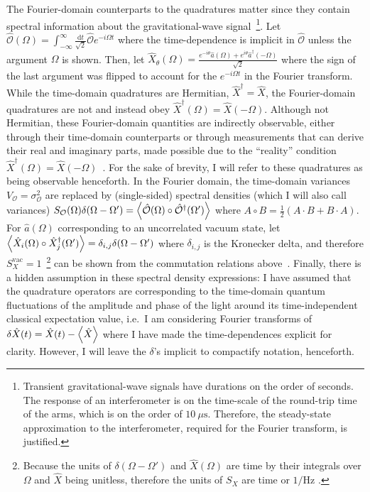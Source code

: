 The Fourier-domain counterparts to the quadratures matter since they contain spectral information about the gravitational-wave signal~\footnote{Transient gravitational-wave signals have durations on the order of seconds. The response of an interferometer is on the time-scale of the round-trip time of the arms, which is on the order of $10~\mu\text{s}$. Therefore, the steady-state approximation to the interferometer, required for the Fourier transform, is justified.}. %
Let $\hat{\mathcal{O}}(\Omega) = \int_{-\infty}^\infty \frac{\mathrm{d}t}{\sqrt{2}} \hat{\mathcal{O}} e^{-i\Omega t}$ where the time-dependence is implicit in $\hat{\mathcal{O}}$ unless the argument $\Omega$ is shown. Then, let $\hat{X}_\theta(\Omega)=\frac{e^{-i \theta}\hat{a}(\Omega)+e^{i \theta}\hat{a}^\dag(-\Omega)}{\sqrt{2}}$ where the sign of the last argument was flipped to account for the $e^{-i\Omega t}$ in the Fourier transform. While the time-domain quadratures are Hermitian, $\hat{X}^\dag=\hat{X}$, the Fourier-domain quadratures are not and instead obey $\hat{X}^\dag(\Omega)=\hat{X}(-\Omega)$. Although not Hermitian, these Fourier-domain quantities are indirectly observable, either through their time-domain counterparts or through measurements that can derive their real and imaginary parts, made possible due to the ``reality'' condition $\hat{X}^\dag(\Omega)=\hat{X}(-\Omega)$~\cite{sourcecitedinReid}. For the sake of brevity, I will refer to these quadratures as being observable henceforth. 
In the Fourier domain, the time-domain variances $V_\mathcal{O}=\sigma_\mathcal{O}^2$ are replaced by (single-sided) spectral densities (which I will also call variances) $S_\mathcal{O}(\Omega)\delta(\Omega-\Omega')=\ev{\hat{\mathcal{O}}(\Omega)\circ\hat{\mathcal{O}}^\dag(\Omega')}$ where $A\circ B=\frac{1}{2}(A\cdot B+B\cdot A)$. For $\hat{a}(\Omega)$ corresponding to an uncorrelated vacuum state, let $\ev{\hat{X}_i(\Omega)\circ\hat{X}_j^\dag(\Omega')}=\delta_{i,j}\delta(\Omega-\Omega')$ where $\delta_{i,j}$ is the Kronecker delta, and therefore $S_X^\text{vac}=1$~\footnote{Because the units of $\delta(\Omega-\Omega')$ and $\hat X(\Omega)$ are time by their integrals over $\Omega$ and $\hat X$ being unitless, therefore the units of $S_X$ are time or $1/\text{Hz}$ .} can be shown from the commutation relations above~\cite{Danilishin}. Finally, there is a hidden assumption in these spectral density expressions: I have assumed that the quadrature operators are corresponding to the time-domain quantum fluctuations of the amplitude and phase of the light around its time-independent classical expectation value, i.e.\ I am considering Fourier transforms of $\delta\hat{X}(t)=\hat{X}(t)-\ev{\hat{X}}$ where I have made the time-dependences explicit for clarity. However, I will leave the $\delta$'s implicit to compactify notation, henceforth.


